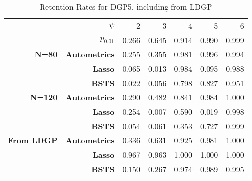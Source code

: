 \documentclass[11pt, oneside]{book}   	%
\begin{document}
\begin{table}[htbp]
  \centering

    \begin{tabular}{rrrrrrr}

          & \boldmath{}\textbf{$\psi$}\unboldmath{} & -2    & 3     & -4    & 5     & -6 \\

        & \boldmath{}\textbf{$p_{0.01}$}\unboldmath{}  & 0.266 & 0.645 & 0.914 & 0.990 & 0.999  \\
    \textbf{N=80} & \textbf{Autometrics} & 0.255 & 0.355 & 0.981 & 0.996 & 0.994 \\
    \textbf{} & \textbf{Lasso} & 0.065 & 0.013 & 0.984 & 0.095 & 0.988 \\
    \textbf{} & \textbf{BSTS} & 0.022 & 0.056 & 0.798 & 0.827 & 0.951 \\
    \textbf{N=120} & \textbf{Autometrics} & 0.290 & 0.482 & 0.841 & 0.984 & 1.000 \\
    \textbf{} & \textbf{Lasso} & 0.254 & 0.007 & 0.590 & 0.019 & 0.998 \\
    \textbf{} & \textbf{BSTS} & 0.054 & 0.061 & 0.353 & 0.727 & 0.999 \\
    \textbf{From LDGP} & \textbf{Autometrics} & 0.336 & 0.631 & 0.925 & 0.981 & 1.000 \\
          & \textbf{Lasso} & 0.967 & 0.963 & 1.000 & 1.000 & 1.000 \\
          & \textbf{BSTS} & 0.150 & 0.267 & 0.974 & 0.989 & 0.995 \\
 
    \end{tabular}%
      \caption{Retention Rates for DGP5, including from LDGP}
  \label{DGP5RetRates}%
\end{table}%
\end{document}
